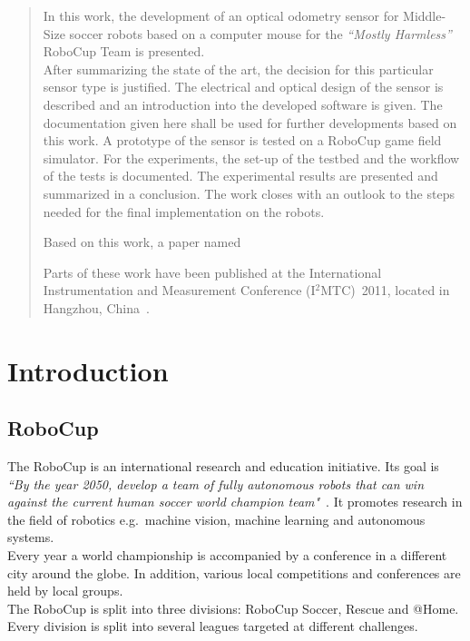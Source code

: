 \documentclass[12pt,a4paper]{article}
\newcommand{\MH}{\emph{``Mostly Harmless''} RoboCup Team\xspace}
\begin{document}


\tableofcontents
\clearpage
\pagestyle{plain}


\begin{abstract}

In this work, the development of an optical odometry sensor for Middle-Size soccer robots based on a computer mouse for the \MH is presented.\\
After summarizing the state of the art, the decision for this particular sensor type is justified.
The electrical and optical design of the sensor is described and an introduction into the developed software is given.
The documentation given here shall be used for further developments based on this work.
A prototype of the sensor is tested on a RoboCup game field simulator.
For the experiments, the set-up of the testbed and the workflow of the tests is documented.
The experimental results are presented and summarized in a conclusion.
The work closes with an outlook to the steps needed for the final implementation on the robots.

Based on this work, a paper named

Parts of these work have been published at the International Instrumentation and Measurement Conference (I$^2$MTC)~2011, located in Hangzhou, China~\cite{i2mtc}.

\end{abstract}

\clearpage

\section{Introduction}


\subsection{RoboCup}

The RoboCup is an international research and education initiative. 
Its goal is \emph{``By the year 2050, develop a team of fully autonomous robots that can win against the current human soccer world champion team"}~\cite{robocup.org}.
It promotes research in the field of robotics e.g.\ machine vision, machine learning and autonomous systems.\\
Every year a world championship is accompanied by a conference in a different city around the globe.
In addition, various local competitions and conferences are held by local groups.\\
The RoboCup is split into three divisions: RoboCup Soccer, Rescue and @Home.
Every division is split into several leagues targeted at different challenges.
\end{document}
